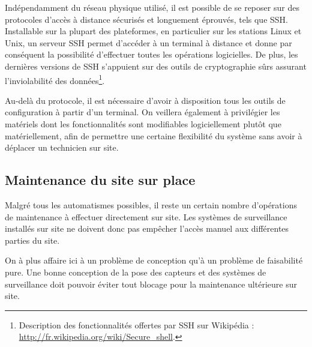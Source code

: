 \documentclass[a4paper, 11pt]{article}
\begin{document}
Indépendamment du réseau physique utilisé, il est possible de se
reposer sur des protocoles d'accès à distance sécurisés et longuement
éprouvés, tels que SSH. Installable sur la plupart des plateformes, en
particulier sur les stations Linux et Unix, un serveur SSH permet
d'accéder à un terminal à distance et donne par conséquent la
possibilité d'effectuer toutes les opérations logicielles. De plus,
les dernières versions de SSH s'appuient sur des outils de
cryptographie sûrs assurant l'inviolabilité des
données\footnote{Description des fonctionnalités offertes par SSH sur
Wikipédia : \url{http://fr.wikipedia.org/wiki/Secure_shell}.}.

Au-delà du protocole, il est nécessaire d'avoir à disposition tous les
outils de configuration à partir d'un terminal. On veillera également
à privilégier les matériels dont les fonctionnalités sont modifiables
logiciellement plutôt que matériellement, afin de permettre une
certaine flexibilité du système sans avoir à déplacer un technicien
sur site.

\subsection{Maintenance du site sur place}

Malgré tous les automatismes possibles, il reste un certain nombre
d'opérations de maintenance à effectuer directement sur site. Les
systèmes de surveillance installés sur site ne doivent donc pas
empêcher l'accès manuel aux différentes parties du site.

On à plus affaire ici à un problème de conception qu'à un problème de
faisabilité pure. Une bonne conception de la pose des capteurs et des
systèmes de surveillance doit pouvoir éviter tout blocage pour la
maintenance ultérieure sur site.

\end{document}
